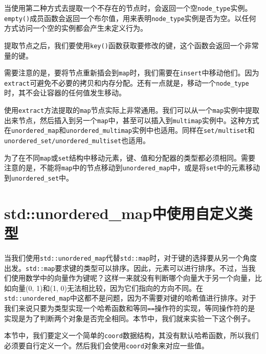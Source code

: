 当使用第二种方式去提取一个不存在的节点时，会返回一个空\texttt{node\_type}实例。\texttt{empty()}成员函数会返回一个布尔值，用来表明\texttt{node\_type}实例是否为空。以任何方式访问一个空的实例都会产生未定义行为。

提取节点之后，我们要使用\texttt{key()}函数获取要修改的键，这个函数会返回一个非常量的键。

需要注意的是，要将节点重新插会到\texttt{map}时，我们需要在\texttt{insert}中移动他们。因为\texttt{extract}可避免不必要的拷贝和内存分配。还有一点就是，移动一个\texttt{node\_type}时，其不会让容器的任何值发生移动。


使用\texttt{extract}方法提取的\texttt{map}节点实际上非常通用。我们可以从一个\texttt{map}实例中提取出来节点，然后插入到另一个\texttt{map}中，甚至可以插入到\texttt{multimap}实例中。这种方式在\texttt{unordered\_map}和\texttt{unordered\_multimap}实例中也适用。同样在\texttt{set/multiset}和\texttt{unordered\_set/unordered\_multiset}也适用。

为了在不同\texttt{map}或\texttt{set}结构中移动元素，键、值和分配器的类型都必须相同。需要注意的是，不能将\texttt{map}中的节点移动到\texttt{unordered\_map}中，或是将\texttt{set}中的元素移动到\texttt{unordered\_set}中。


\section{std::unordered\_map中使用自定义类型}

当我们使用\texttt{std::unordered\_map}代替\texttt{std::map}时，对于键的选择要从另一个角度出发。\texttt{std::map}要求键的类型可以排序。因此，元素可以进行排序。不过，当我们使用数学中的向量作为键呢？这样一来就没有判断哪个向量大于另一个向量，比如向量(0, 1)和(1, 0)无法相比较，因为它们指向的方向不同。在\texttt{std::unordered\_map}中这都不是问题，因为不需要对键的哈希值进行排序。对于我们来说只要为类型实现一个哈希函数和等同\texttt{==}操作符的实现，等同操作符的是实现是为了判断两个对象是否完全相同。本节中，我们就来实验一下这个例子。


本节中，我们要定义一个简单的\texttt{coord}数据结构，其没有默认哈希函数，所以我们必须要自行定义一个。然后我们会使用\texttt{coord}对象来对应一些值。

